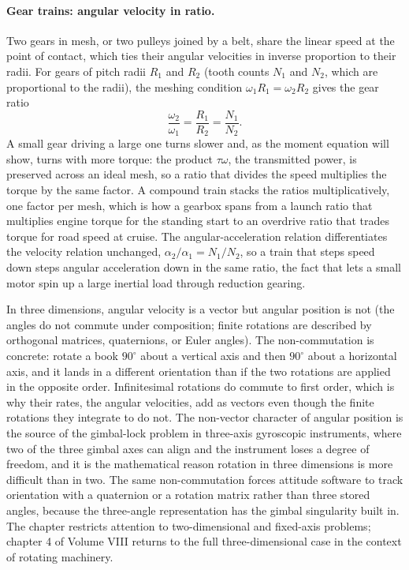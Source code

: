 \paragraph{Gear trains: angular velocity in ratio.} Two gears in mesh,
or two pulleys joined by a belt, share the linear speed at the point of
contact, which ties their angular velocities in inverse proportion to
their radii. For gears of pitch radii $R_{1}$ and $R_{2}$ (tooth counts
$N_{1}$ and $N_{2}$, which are proportional to the radii), the meshing
condition $\omega_{1}R_{1}=\omega_{2}R_{2}$ gives the gear ratio
\[
\frac{\omega_{2}}{\omega_{1}}=\frac{R_{1}}{R_{2}}=\frac{N_{1}}{N_{2}}.
\]
A small gear driving a large one turns slower and, as the moment
equation will show, turns with more torque: the product $\tau\omega$,
the transmitted power, is preserved across an ideal mesh, so a ratio
that divides the speed multiplies the torque by the same factor. A
compound train stacks the ratios multiplicatively, one factor per mesh,
which is how a gearbox spans from a launch ratio that multiplies engine
torque for the standing start to an overdrive ratio that trades torque
for road speed at cruise. The angular-acceleration relation
differentiates the velocity relation unchanged, $\alpha_{2}/\alpha_{1}=
N_{1}/N_{2}$, so a train that steps speed down steps angular acceleration
down in the same ratio, the fact that lets a small motor spin up a large
inertial load through reduction gearing.

In three dimensions, angular velocity is a vector but angular position
is not (the angles do not commute under composition; finite rotations
are described by orthogonal matrices, quaternions, or Euler angles).
The non-commutation is concrete: rotate a book $90^{\circ}$ about a
vertical axis and then $90^{\circ}$ about a horizontal axis, and it
lands in a different orientation than if the two rotations are applied
in the opposite order. Infinitesimal rotations do commute to first
order, which is why their rates, the angular velocities, add as
vectors even though the finite rotations they integrate to do not. The
non-vector character of angular position is the source of the
gimbal-lock problem in three-axis gyroscopic instruments, where two of
the three gimbal axes can align and the instrument loses a degree of
freedom, and it is the mathematical reason rotation in three dimensions
is more difficult than in two. The same non-commutation forces
attitude software to track orientation with a quaternion or a rotation
matrix rather than three stored angles, because the three-angle
representation has the gimbal singularity built in. The chapter
restricts attention to two-dimensional and fixed-axis problems;
chapter 4 of Volume VIII returns to the full three-dimensional case in
the context of rotating machinery.

